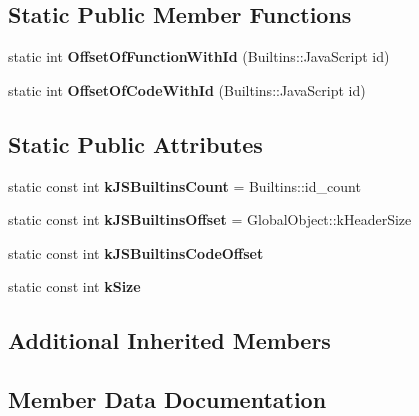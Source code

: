 \subsection*{Static Public Member Functions}
\begin{DoxyCompactItemize}
\item 
\hypertarget{classv8_1_1internal_1_1_j_s_builtins_object_a95d46cb62a18c83f36dd57cfb1723cc4}{}static int {\bfseries Offset\+Of\+Function\+With\+Id} (Builtins\+::\+Java\+Script id)\label{classv8_1_1internal_1_1_j_s_builtins_object_a95d46cb62a18c83f36dd57cfb1723cc4}

\item 
\hypertarget{classv8_1_1internal_1_1_j_s_builtins_object_ae3e45c73abd310e98e52eddd91c01d7c}{}static int {\bfseries Offset\+Of\+Code\+With\+Id} (Builtins\+::\+Java\+Script id)\label{classv8_1_1internal_1_1_j_s_builtins_object_ae3e45c73abd310e98e52eddd91c01d7c}

\end{DoxyCompactItemize}
\subsection*{Static Public Attributes}
\begin{DoxyCompactItemize}
\item 
\hypertarget{classv8_1_1internal_1_1_j_s_builtins_object_a59cb5664931f6e9ef315c0f505cfa22b}{}static const int {\bfseries k\+J\+S\+Builtins\+Count} = Builtins\+::id\+\_\+count\label{classv8_1_1internal_1_1_j_s_builtins_object_a59cb5664931f6e9ef315c0f505cfa22b}

\item 
\hypertarget{classv8_1_1internal_1_1_j_s_builtins_object_a41ac3121a3e284b6240b9b83c71f8e79}{}static const int {\bfseries k\+J\+S\+Builtins\+Offset} = Global\+Object\+::k\+Header\+Size\label{classv8_1_1internal_1_1_j_s_builtins_object_a41ac3121a3e284b6240b9b83c71f8e79}

\item 
static const int {\bfseries k\+J\+S\+Builtins\+Code\+Offset}
\item 
static const int {\bfseries k\+Size}
\end{DoxyCompactItemize}
\subsection*{Additional Inherited Members}


\subsection{Member Data Documentation}
\hypertarget{classv8_1_1internal_1_1_j_s_builtins_object_adc167467ed32e68550558f20873f0f37}{}
